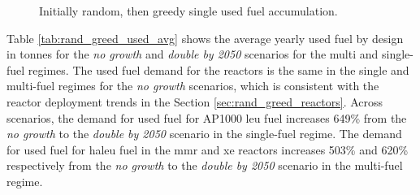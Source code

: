   \begin{figure}[H]
    \hfill
    \caption{Initially random, then greedy single used fuel accumulation.}
    \label{fig:rand_greed_of_used}
  \end{figure}


Table \ref{tab:rand_greed_used_avg} shows the average yearly used fuel by design in tonnes for the \textit{no growth} and \textit{double by 2050} scenarios for the multi and single-fuel regimes. The used fuel demand for the reactors is the same in the single and multi-fuel regimes for the \textit{no growth} scenarios, which is consistent with the reactor deployment trends in the Section \ref{sec:rand_greed_reactors}. Across scenarios, the demand for used fuel for AP1000 \gls{leu} fuel increases 649\% from the \textit{no growth} to the \textit{double by 2050} scenario in the single-fuel regime. The demand for used fuel for \gls{haleu} fuel in the \gls{mmr} and \gls{xe} reactors increases 503\% and 620\% respectively from the \textit{no growth} to the \textit{double by 2050} scenario in the multi-fuel regime.

